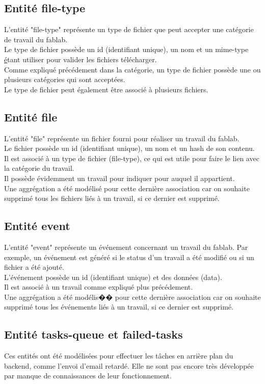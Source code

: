 \documentclass[
    iai, %
    il, %
]{heig-tb}
\begin{document}
\subsection{Entité file-type}
L'entité "file-type" représente un type de fichier que peut accepter une catégorie de travail du fablab.\\
Le type de fichier possède un id (identifiant unique), un nom et un mime-type \href{https://developer.mozilla.org/fr/docs/Web/HTTP/Basics_of_HTTP/MIME_Types} étant utiliser pour valider les fichiers télécharger.\\
Comme expliqué précédement dans la catégorie, un type de fichier possède une ou plusieurs catégories qui sont acceptées.\\
Le type de fichier peut également être associé à plusieurs fichiers.

\subsection{Entité file}
L'entité "file" représente un fichier fourni pour réaliser un travail du fablab.\\
Le fichier possède un id (identifiant unique), un nom et un hash de son contenu.\\
Il est associé à un type de fichier (file-type), ce qui est utile pour faire le lien avec la catégorie du travail.\\
Il possède évidemment un travail pour indiquer pour auquel il appartient.\\
Une aggrégation a été modélisé pour cette dernière association car on souhaite supprimé tous les fichiers liés à un travail, si ce dernier est supprimé.

\subsection{Entité event}
L'entité "event" représente un événement concernant un travail du fablab. Par exemple, un événement est généré si le status d'un travail a été modifié ou si un fichier a été ajouté.\\
L'événement possède un id (identifiant unique) et des données (data).\\
Il est associé à un travail comme expliqué plus précédement.\\
Une aggrégation a été modélis�� pour cette dernière association car on souhaite supprimé tous les événements liés à un travail, si ce dernier est supprimé.

\subsection{Entité tasks-queue et failed-tasks}
Ces entités ont été modélisées pour effectuer les tâches en arrière plan du backend, comme l'envoi d'email retardé. Elle ne sont pas encore très développée par manque de connaissances de leur fonctionnement.
\end{document}
